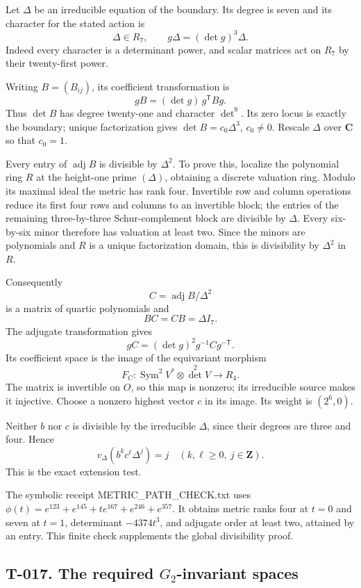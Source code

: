 \documentclass[
  10pt,
]{article}
\begin{document}
Let \(\Delta\) be an irreducible equation of the boundary. Its degree is
seven and its character for the stated action is \[
\Delta\in R_7,\qquad g\Delta=(\det g)^3\Delta.
\tag{W7.5}
\] Indeed every character is a determinant power, and scalar matrices
act on \(R_7\) by their twenty-first power.

Writing \(B=(B_{ij})\), its coefficient transformation is \[
gB=(\det g)\,g^{\mathsf T}Bg.
\] Thus \(\det B\) has degree twenty-one and character \(\det^9\). Its
zero locus is exactly the boundary; unique factorization gives
\(\det B=c_0\Delta^3\), \(c_0\ne0\). Rescale \(\Delta\) over
\(\mathbf C\) so that \(c_0=1\).

Every entry of \(\operatorname{adj}B\) is divisible by \(\Delta^2\). To
prove this, localize the polynomial ring \(R\) at the height-one prime
\((\Delta)\), obtaining a discrete valuation ring. Modulo its maximal
ideal the metric has rank four. Invertible row and column operations
reduce its first four rows and columns to an invertible block; the
entries of the remaining three-by-three Schur-complement block are
divisible by \(\Delta\). Every six-by-six minor therefore has valuation
at least two. Since the minors are polynomials and \(R\) is a unique
factorization domain, this is divisibility by \(\Delta^2\) in \(R\).

Consequently \[
C=\operatorname{adj}B/\Delta^2
\tag{W7.6}
\] is a matrix of quartic polynomials and \[
BC=CB=\Delta I_7.
\tag{W7.7}
\] The adjugate transformation gives \[
gC=(\det g)^2g^{-1}Cg^{-\mathsf T}.
\] Its coefficient space is the image of the equivariant morphism \[
F_C:\operatorname{Sym}^2V^*\otimes\det^2V\longrightarrow R_4.
\tag{W7.8}
\] The matrix is invertible on \(O\), so this map is nonzero; its
irreducible source makes it injective. Choose a nonzero highest vector
\(c\) in its image. Its weight is \((2^6,0)\).

Neither \(b\) nor \(c\) is divisible by the irreducible \(\Delta\),
since their degrees are three and four. Hence \[
v_\Delta(b^kc^\ell\Delta^j)=j
\quad(k,\ell\ge0,\ j\in\mathbf Z).
\tag{W7.9}
\] This is the exact extension test.

The symbolic receipt METRIC\_PATH\_CHECK.txt uses
\(\phi(t)=e^{123}+e^{145}+t e^{167}+e^{246}+e^{357}\). It obtains metric
ranks four at \(t=0\) and seven at \(t=1\), determinant \(-4374t^3\),
and adjugate order at least two, attained by an entry. This finite check
supplements the global divisibility proof.

\subsection{\texorpdfstring{T-017. The required \(G_2\)-invariant
spaces}{T-017. The required G\_2-invariant spaces}}\label{t-017.-the-required-g_2-invariant-spaces}
\end{document}
